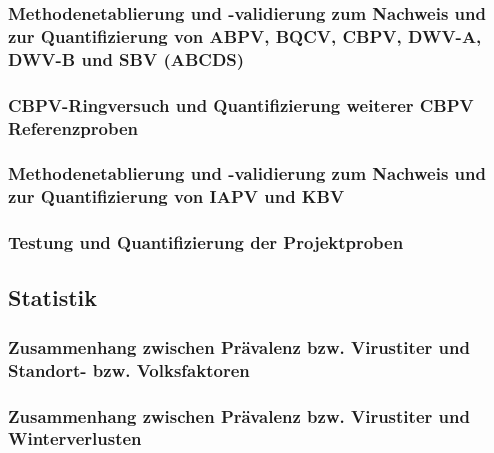 \blindtext

\subsubsection{Methodenetablierung und -validierung zum Nachweis und zur Quantifizierung von ABPV, BQCV, CBPV, DWV-A, DWV-B und SBV (ABCDS)}

\blindtext

\subsubsection{CBPV-Ringversuch und Quantifizierung weiterer CBPV Referenzproben}

\blindtext

\subsubsection{Methodenetablierung und -validierung zum Nachweis und zur Quantifizierung von IAPV und KBV}

\blindtext

\subsubsection{Testung und Quantifizierung der Projektproben}

\blindtext

\subsection{Statistik}

\subsubsection{Zusammenhang zwischen Prävalenz bzw. Virustiter und Standort- bzw.
Volksfaktoren}

\blindtext

\subsubsection{Zusammenhang zwischen Prävalenz bzw. Virustiter und Winterverlusten}

\blindtext